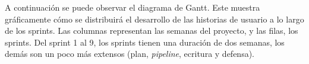 \documentclass[
11pt, %
]{charter}
\begin{document}











A continuación se puede observar el diagrama de Gantt. Este muestra gráficamente cómo se distribuirá el desarrollo de las historias de usuario a lo largo de los sprints. Las columnas representan las semanas del proyecto, y las filas, los sprints. Del sprint 1 al 9, los sprints tienen una duración de dos semanas, los demás son un poco más extensos (plan, \textit{pipeline}, ecritura y defensa).
\end{document}
